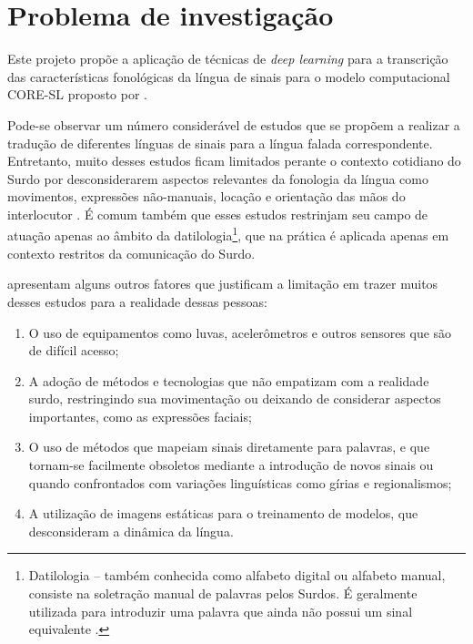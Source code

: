 

\maketitle

\section{Problema de investigação}
\label{sec:problema-investigacao}

Este projeto propõe a aplicação de técnicas de \textit{deep learning} para a transcrição das características fonológicas da língua de sinais para o modelo computacional CORE-SL proposto por \textcite{antunes-2015}. 

Pode-se observar um número considerável de estudos que se propõem a realizar a tradução de diferentes línguas de sinais para a língua falada correspondente. Entretanto, muito desses estudos ficam limitados perante o contexto cotidiano do Surdo por desconsiderarem aspectos relevantes da fonologia da língua como movimentos, expressões não-manuais, locação e orientação das mãos do interlocutor \cite{quadros-2004}. É comum também que esses estudos restrinjam seu campo de atuação apenas ao âmbito da datilologia\footnote{
Datilologia – também conhecida como alfabeto digital ou alfabeto manual, consiste na soletração manual de palavras pelos Surdos. É geralmente utilizada para introduzir uma palavra que ainda não possui um sinal equivalente \cite{quadros-2004}\cite{pereira-choi-2011}.
}, que na prática é aplicada apenas em contexto restritos da comunicação do Surdo.

\textcite{antunes-hcisl-2011} apresentam alguns outros fatores que justificam a limitação em trazer muitos desses estudos para a realidade dessas pessoas: 
\begin{enumerate}
\item O uso de equipamentos como luvas, acelerômetros e outros sensores que são de difícil acesso; 
\item A adoção de métodos e tecnologias que não empatizam com a realidade surdo, restringindo sua movimentação ou deixando de considerar aspectos importantes, como as expressões faciais;
\item O uso de métodos que mapeiam sinais diretamente para palavras, e que tornam-se facilmente obsoletos mediante a introdução de novos sinais ou quando confrontados com variações linguísticas como gírias e regionalismos; 
\item A utilização de imagens estáticas para o treinamento de modelos, que desconsideram a dinâmica da língua.
\end{enumerate}

